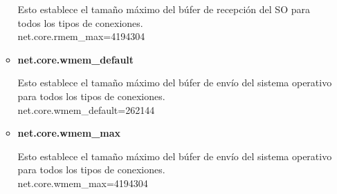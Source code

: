 \begin{itemize}
\begin{itemize}
\begin{flushleft}
Esto establece el tamaño máximo del búfer de recepción del SO para todos los tipos de conexiones.\\
\vspace{5mm}
net.core.rmem\_max=4194304\\
\end{flushleft}

	\item \textbf{net.core.wmem\_default}

\begin{flushleft}
Esto establece el tamaño máximo del búfer de envío del sistema operativo para todos los tipos de conexiones.\\
\vspace{5mm}
net.core.wmem\_default=262144\\
\end{flushleft}

	\item \textbf{net.core.wmem\_max}

\begin{flushleft}
Esto establece el tamaño máximo del búfer de envío del sistema operativo para todos los tipos de conexiones.\\
\vspace{5mm}
net.core.wmem\_max=4194304\\
\end{flushleft}

\end{itemize}


\end{itemize}
